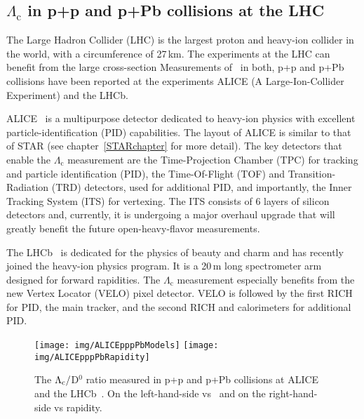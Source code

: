 \subsection{$\Lambda_\mathrm{c}$ in p+p and p+Pb collisions at the LHC\label{LcInPPandPPb}}
The Large Hadron Collider (LHC) is the largest proton and heavy-ion collider in the world, with a circumference of 27$\,$km. The experiments at the LHC can benefit from the large cross-section  Measurements of \Lambdac\ in both, p+p and p+Pb collisions have been reported at  the experiments ALICE (A Large-Ion-Collider Experiment) and the LHCb. 

ALICE~\cite{ALICE} is a multipurpose detector dedicated to heavy-ion physics with excellent particle-identification (PID) capabilities. The layout of ALICE is similar to that of STAR (see chapter~\ref{STARchapter} for more detail). The key detectors that enable the $\Lambda_\mathrm{c}$ measurement are the Time-Projection Chamber (TPC) for tracking and particle identification (PID), the Time-Of-Flight (TOF) and Transition-Radiation (TRD) detectors, used for additional PID, and importantly, the Inner Tracking System (ITS) for vertexing. The ITS consists of 6 layers of silicon detectors and, currently, it is undergoing a major overhaul upgrade that will greatly benefit the future open-heavy-flavor measurements.

The LHCb~\cite{LHCb} is dedicated for the physics of beauty and charm and has recently joined the heavy-ion physics program. It is a 20$\,$m long spectrometer arm designed for forward rapidities. The $\Lambda_\mathrm{c}$ measurement especially benefits from the new Vertex Locator (VELO) \cite{VELO} pixel detector. VELO is followed by the first RICH for PID, the main tracker, and the second RICH and calorimeters for additional PID.

\begin{figure}[!htb]
\centering
\texttt{[image: img/ALICEpppPbModels]}
\texttt{[image: img/ALICEpppPbRapidity]}
\caption[The $\Lambdac/$D$^0$ ratio measured in p+p and p+Pb collisions at ALICE\@.]{The $\Lambdac/$D$^0$ ratio measured in p+p and p+Pb collisions at ALICE~\cite{AliceLcPPPPb} and the LHCb~\cite{LHCbPrompt, LHCbPrivate}. On the left-hand-side vs \pt\ and on the right-hand-side vs rapidity.}
\label{fig:pppPb}
\end{figure}

